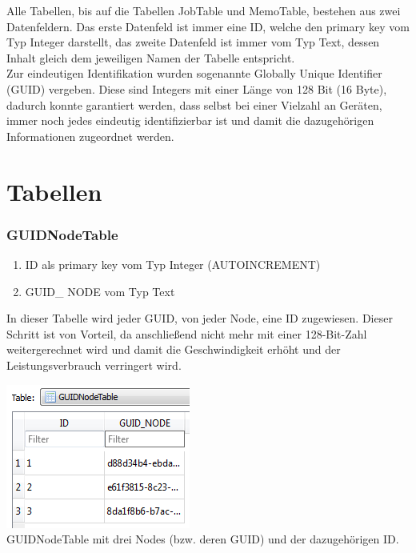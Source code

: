 \documentclass[12pt,a4paper]{report}
\begin{document}
\begin{onehalfspace}
Alle Tabellen, bis auf die Tabellen JobTable und MemoTable, bestehen aus zwei Datenfeldern. Das erste Datenfeld ist immer eine ID, welche den primary key vom Typ Integer darstellt, das zweite Datenfeld ist immer vom Typ Text, dessen Inhalt gleich dem jeweiligen Namen der Tabelle entspricht.\\

Zur eindeutigen Identifikation wurden sogenannte Globally Unique Identifier (GUID) vergeben. Diese sind Integers mit einer Länge von 128 Bit (16 Byte), dadurch konnte garantiert werden, dass selbst bei einer Vielzahl an Geräten, immer noch jedes eindeutig identifizierbar ist und damit die dazugehörigen Informationen zugeordnet werden.
\section{Tabellen}
\subsubsection{GUIDNodeTable}
\begin{enumerate}
\item ID als primary key vom Typ Integer (AUTOINCREMENT)
\item GUID\_ NODE vom Typ Text
\end{enumerate}
In dieser Tabelle wird jeder GUID, von jeder Node, eine ID zugewiesen. Dieser Schritt ist von Vorteil, da anschließend nicht mehr mit einer 128-Bit-Zahl weitergerechnet wird und damit die Geschwindigkeit erhöht und der Leistungsverbrauch verringert wird.
\begin{center}
\includegraphics[scale=0.8]{img/db-tb-guid-node.png}\\
GUIDNodeTable mit drei Nodes (bzw. deren GUID) und der dazugehörigen ID.
\end{center}

\end{onehalfspace}
\end{document}
